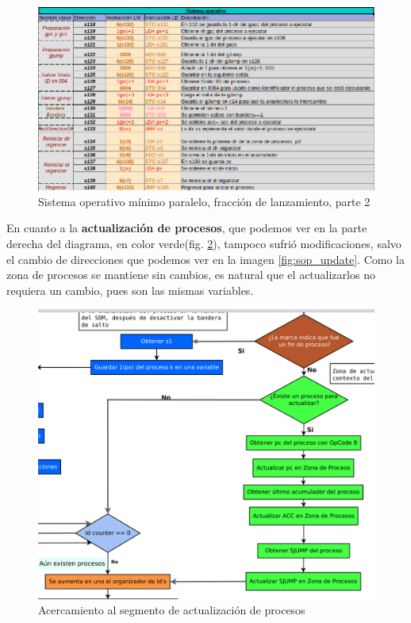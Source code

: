 \documentclass[letterpaper,12pt,oneside]{book}
\begin{document}
			
			\begin{figure}[h]		
				\centering
				\includegraphics[scale=0.5]{media/Paralela/sop_launch2.png}
				\caption{ Sistema operativo mínimo paralelo, fracción de lanzamiento, parte 2}
				\label{fig:sop_launch2}
			\end{figure}	


			En cuanto a la \textbf{actualización de procesos}, que podemos ver en la parte derecha del diagrama, en color verde(fig. \ref{fig:diag_somp_update_process}),
			tampoco sufrió modificaciones, salvo el cambio de direcciones que podemos ver en la imagen \ref{fig:sop_update}. Como la zona de procesos
			se mantiene sin cambios, es natural que el actualizarlos no requiera un cambio, pues son las mismas variables.


			\begin{figure}[h]		
				\centering
				\includegraphics[scale=0.4]{media/Paralela/diag_somp_update_process.png}
				\caption{Acercamiento al segmento de actualización de procesos}
				\label{fig:diag_somp_update_process}
			\end{figure}
\end{document}
